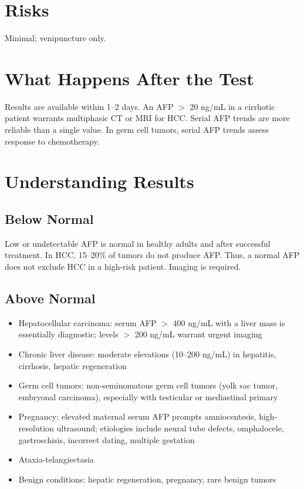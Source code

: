 \section*{Risks}
Minimal; venipuncture only.

\section*{What Happens After the Test}
Results are available within 1--2 days. An AFP $>$ 20 ng/mL in a cirrhotic patient warrants multiphasic CT or MRI for HCC. Serial AFP trends are more reliable than a single value. In germ cell tumors, serial AFP trends assess response to chemotherapy.

\section*{Understanding Results}

\subsection*{Below Normal}
Low or undetectable AFP is normal in healthy adults and after successful treatment. In HCC, 15--20\% of tumors do not produce AFP. Thus, a normal AFP does not exclude HCC in a high-risk patient. Imaging is required.

\subsection*{Above Normal}
\begin{itemize}
  \item Hepatocellular carcinoma: serum AFP $>$ 400 ng/mL with a liver mass is essentially diagnostic; levels $>$ 200 ng/mL warrant urgent imaging
  \item Chronic liver disease: moderate elevations (10--200 ng/mL) in hepatitis, cirrhosis, hepatic regeneration
  \item Germ cell tumors: non-seminomatous germ cell tumors (yolk sac tumor, embryonal carcinoma), especially with testicular or mediastinal primary
  \item Pregnancy: elevated maternal serum AFP prompts amniocentesis, high-resolution ultrasound; etiologies include neural tube defects, omphalocele, gastroschisis, incorrect dating, multiple gestation
  \item Ataxia-telangiectasia
  \item Benign conditions: hepatic regeneration, pregnancy, rare benign tumors
\end{itemize}

